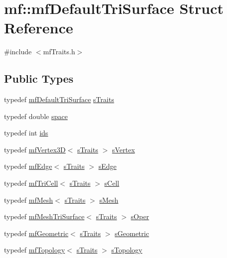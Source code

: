 \hypertarget{structmf_1_1mfDefaultTriSurface}{
\section{mf::mfDefaultTriSurface Struct Reference}
\label{structmf_1_1mfDefaultTriSurface}
}


{\ttfamily \#include $<$mfTraits.h$>$}

\subsection*{Public Types}
\begin{DoxyCompactItemize}
\item 
typedef \hyperlink{structmf_1_1mfDefaultTriSurface}{mfDefaultTriSurface} \hyperlink{structmf_1_1mfDefaultTriSurface_a5c521b16ac8225693266fec444241084}{sTraits}
\item 
typedef double \hyperlink{structmf_1_1mfDefaultTriSurface_af6237ce42d8f511466140e023477ddca}{space}
\item 
typedef int \hyperlink{structmf_1_1mfDefaultTriSurface_ae35bbc7e78b5e343253df5ac864f5b84}{ids}
\item 
typedef \hyperlink{classmf_1_1mfVertex3D}{mfVertex3D}$<$ \hyperlink{structmf_1_1mfDefaultTriSurface}{sTraits} $>$ \hyperlink{structmf_1_1mfDefaultTriSurface_a6470bc28e1c9e3c9524a4a3ac6718e94}{sVertex}
\item 
typedef \hyperlink{classmf_1_1mfEdge}{mfEdge}$<$ \hyperlink{structmf_1_1mfDefaultTriSurface}{sTraits} $>$ \hyperlink{structmf_1_1mfDefaultTriSurface_ab9b21363dec8397617e08815969e2e74}{sEdge}
\item 
typedef \hyperlink{classmf_1_1mfTriCell}{mfTriCell}$<$ \hyperlink{structmf_1_1mfDefaultTriSurface}{sTraits} $>$ \hyperlink{structmf_1_1mfDefaultTriSurface_ac440261ed211ca9d7ca2b93b58c3cf32}{sCell}
\item 
typedef \hyperlink{classmf_1_1mfMesh}{mfMesh}$<$ \hyperlink{structmf_1_1mfDefaultTriSurface}{sTraits} $>$ \hyperlink{structmf_1_1mfDefaultTriSurface_a8a7c339735cc6cc0fd04c9c6c22407f7}{sMesh}
\item 
typedef \hyperlink{classmf_1_1mfMeshTriSurface}{mfMeshTriSurface}$<$ \hyperlink{structmf_1_1mfDefaultTriSurface}{sTraits} $>$ \hyperlink{structmf_1_1mfDefaultTriSurface_a7f212692b1ccab0319f7cec468d17794}{sOper}
\item 
typedef \hyperlink{classmf_1_1mfGeometric}{mfGeometric}$<$ \hyperlink{structmf_1_1mfDefaultTriSurface}{sTraits} $>$ \hyperlink{structmf_1_1mfDefaultTriSurface_a6b9571826473f2d8c08f7f7d088237ea}{sGeometric}
\item 
typedef \hyperlink{classmf_1_1mfTopology}{mfTopology}$<$ \hyperlink{structmf_1_1mfDefaultTriSurface}{sTraits} $>$ \hyperlink{structmf_1_1mfDefaultTriSurface_a7679a9f9f0041ec734572e8da23acd92}{sTopology}
\end{DoxyCompactItemize}



